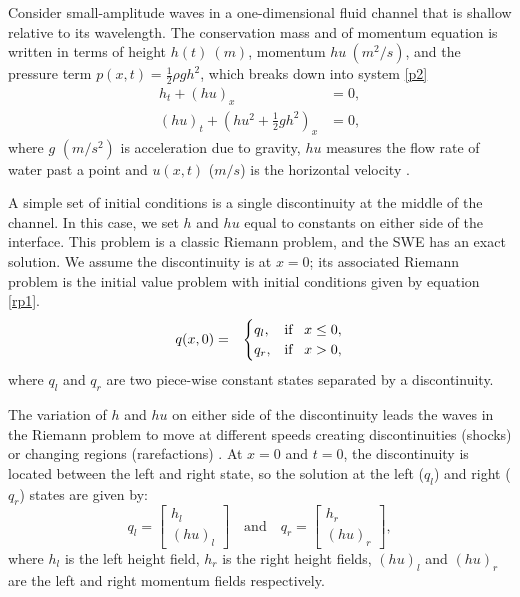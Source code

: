 \documentclass[9pt,a4paper]{article}
\begin{document}
	Consider small-amplitude waves in a one-dimensional fluid channel that is shallow relative to its wavelength. The conservation mass and of momentum equation is written in terms of  height $h(t)~(m)$, momentum $hu~(m^{2}/s)$, and  the pressure term $p(x,t) = \frac{1}{2}\rho gh^{2}$, which breaks down into system \eqref{p2}
	\begin{equation}
		\begin{aligned}
			h_{t} + (hu)_x &= 0, \\
			(hu)_t + \left(hu^{2} + \frac{1}{2} gh^{2} \right)_x & = 0,
		\end{aligned}
		\label{p2}
	\end{equation}	
	where $g$ $(m/s^{2})$ is acceleration due to gravity, $hu$ measures the flow rate of water past a point and $u(x,t)$ ($m/s$) is the horizontal velocity  \citep{leveque2002finite,toro2001shock}.  
	
	A simple set of initial conditions is a single discontinuity at the middle of the channel.  In this case, we set $h$ and $hu$ equal to constants on either side of the interface.  This problem is a classic Riemann problem, and the SWE has an exact solution.  We assume the discontinuity is at $x = 0$; its associated Riemann problem is the initial value problem with initial conditions given by equation \eqref{rp1}.
	\begin{eqnarray}
		q(x,0)& =& \begin{cases}
			q_{l}, & \text{if \, $x \le 0,$}\\
			q_{r},& \text{if \, $x > 0,$}\\
			
		\end{cases}  
		\label{rp1}     
	\end{eqnarray}
	where $q_{l}$ and $q_{r}$ are two piece-wise constant states separated by a discontinuity. 
	
	The variation of $h$ and $hu$ on either side of the discontinuity leads the waves in the Riemann problem to move at different speeds creating discontinuities (shocks) or changing regions (rarefactions) \citep{leveque2002finite}.  At $x = 0$ and $t = 0$,   the discontinuity is located between the left and right state, so the solution at the left ($q_{l}$) and right ($q_{r}$) states are given by: 
	\begin{equation}
		q_{l} = \begin{bmatrix}
			h_{l} \\(hu)_{l}
		\end{bmatrix}  \quad \text{and} \quad q_{r} = \begin{bmatrix}
			h_{r} \\(hu)_{r}
		\end{bmatrix},
		\label{ic}
	\end{equation}
	where $h_l$ is the left height field,  $h_r$ is the right height fields, $(hu)_l$ and $(hu)_r$ are the left and right momentum fields respectively.
	
\end{document}
